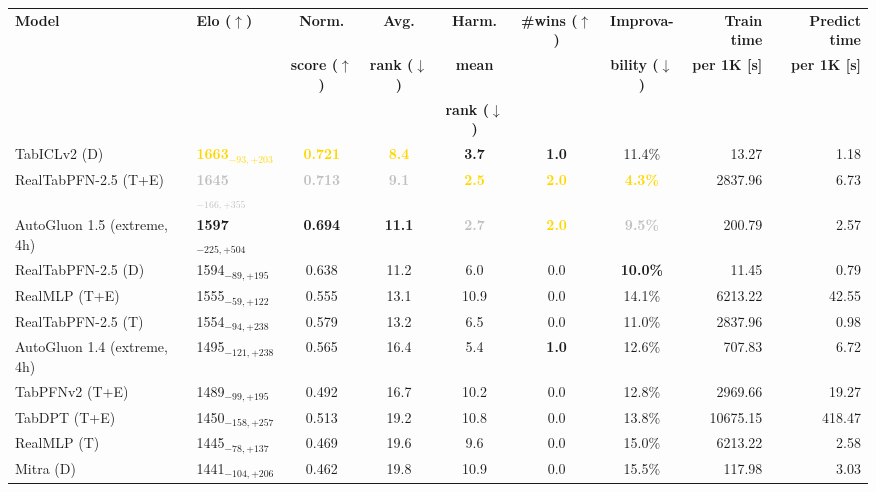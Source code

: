 \begin{tabular}{llcccccrr}
\toprule
\textbf{Model} & \textbf{Elo ($\uparrow$)} & \textbf{Norm.} & \textbf{Avg.} & \textbf{Harm.} & \textbf{\#wins ($\uparrow$)} & \textbf{Improva-} & \textbf{Train time} & \textbf{Predict time} \\
 &  & \textbf{score ($\uparrow$)} & \textbf{rank ($\downarrow$)} & \textbf{mean} &  & \textbf{bility ($\downarrow$)} & \textbf{per 1K [s]} & \textbf{per 1K [s]} \\
 &  &  &  & \textbf{rank ($\downarrow$)} &  &  &  &  \\
\midrule
TabICLv2 (D) & \textcolor{gold}{\textbf{1663${}_{-93,+203}$}} & \textcolor{gold}{\textbf{0.721}} & \textcolor{gold}{\textbf{8.4}} & \textcolor{bronze}{\textbf{3.7}} & \textcolor{bronze}{\textbf{1.0}} & 11.4\% & 13.27 & 1.18 \\
RealTabPFN-2.5 (T+E) & \textcolor{silver}{\textbf{1645${}_{-166,+355}$}} & \textcolor{silver}{\textbf{0.713}} & \textcolor{silver}{\textbf{9.1}} & \textcolor{gold}{\textbf{2.5}} & \textcolor{gold}{\textbf{2.0}} & \textcolor{gold}{\textbf{4.3\%}} & 2837.96 & 6.73 \\
AutoGluon 1.5 (extreme, 4h) & \textcolor{bronze}{\textbf{1597${}_{-225,+504}$}} & \textcolor{bronze}{\textbf{0.694}} & \textcolor{bronze}{\textbf{11.1}} & \textcolor{silver}{\textbf{2.7}} & \textcolor{gold}{\textbf{2.0}} & \textcolor{silver}{\textbf{9.5\%}} & 200.79 & 2.57 \\
RealTabPFN-2.5 (D) & 1594${}_{-89,+195}$ & 0.638 & 11.2 & 6.0 & 0.0 & \textcolor{bronze}{\textbf{10.0\%}} & 11.45 & 0.79 \\
RealMLP (T+E) & 1555${}_{-59,+122}$ & 0.555 & 13.1 & 10.9 & 0.0 & 14.1\% & 6213.22 & 42.55 \\
RealTabPFN-2.5 (T) & 1554${}_{-94,+238}$ & 0.579 & 13.2 & 6.5 & 0.0 & 11.0\% & 2837.96 & 0.98 \\
AutoGluon 1.4 (extreme, 4h) & 1495${}_{-121,+238}$ & 0.565 & 16.4 & 5.4 & \textcolor{bronze}{\textbf{1.0}} & 12.6\% & 707.83 & 6.72 \\
TabPFNv2 (T+E) & 1489${}_{-99,+195}$ & 0.492 & 16.7 & 10.2 & 0.0 & 12.8\% & 2969.66 & 19.27 \\
TabDPT (T+E) & 1450${}_{-158,+257}$ & 0.513 & 19.2 & 10.8 & 0.0 & 13.8\% & 10675.15 & 418.47 \\
RealMLP (T) & 1445${}_{-78,+137}$ & 0.469 & 19.6 & 9.6 & 0.0 & 15.0\% & 6213.22 & 2.58 \\
Mitra (D) & 1441${}_{-104,+206}$ & 0.462 & 19.8 & 10.9 & 0.0 & 15.5\% & 117.98 & 3.03 \\

\end{tabular}
